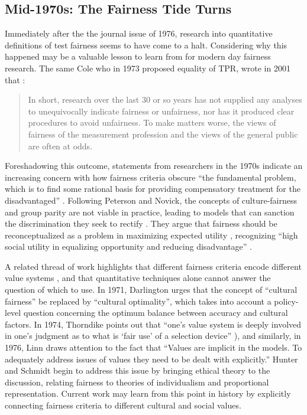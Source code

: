 \documentclass[sigconf,letterpaper,9pt]{acmart}
\begin{document}
\subsection{Mid-1970s: The Fairness Tide Turns}

Immediately after the the journal issue of 1976, research into quantitative definitions of test fairness
seems to have come to a halt.  Considering why this happened may be a valuable lesson to learn from for modern day fairness research. The same Cole who in 1973 proposed equality of TPR, wrote in 2001 that \cite{cole2001new}:

\begin{quote}
\fontsize{8.5}{10}\selectfont
In short, research over the last 30 or so years has not supplied any analyses
to unequivocally indicate fairness or unfairness, nor has it produced clear procedures to avoid unfairness. To make matters worse, the views of fairness of the
measurement profession and the views of the general public are often at odds.
\end{quote}

Foreshadowing this outcome, statements from researchers in the 1970s indicate an  increasing concern with how fairness criteria obscure ``the fundamental problem, which is to find some rational basis for providing compensatory
treatment for the disadvantaged'' \cite{novick1976towards}.  Following Peterson and Novick, the concepts of culture-fairness and group parity are not viable in practice, leading to models that can sanction the discrimination they seek to rectify \cite{petersen1976evaluation}.  They argue that fairness should be reconceptualized as a problem in maximizing expected utility \cite{petersen1976expected}, recognizing  ``high social utility in equalizing opportunity and 
reducing disadvantage'' \cite{novick1976towards}.

A related thread of work highlights that different fairness criteria encode 
different value systems \cite{hunter1976critical}, and that 
quantitative techniques alone cannot answer
the question of which to use.
In 1971, Darlington \cite{darlington1971another} urges that the concept of ``cultural fairness'' be replaced by ``cultural
optimality'', which takes into account a policy-level question concerning the optimum balance between accuracy and cultural factors.  In 1974, Thorndike points out that ``one's value system is deeply involved in one's judgment as to what is `fair use'
of a selection device'' \cite{novick1976towards}),  %
and similarly, in 1976, Linn \cite{linn1976insearch} draws attention to the fact that ``Values are implicit in the models. To adequately address issues of values they need to be dealt with explicitly.'' Hunter and Schmidt \cite{hunter1976critical} begin to address this issue by bringing ethical theory to the discussion, relating fairness to theories of individualism and proportional representation.  Current work may learn from this point in history by explicitly connecting fairness criteria to different cultural and social values.  
\end{document}
